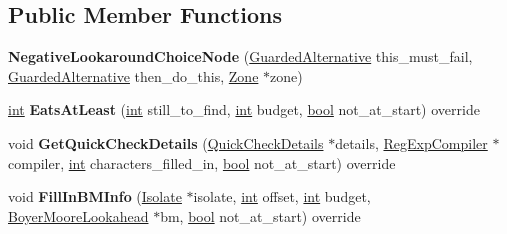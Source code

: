 \subsection*{Public Member Functions}
\begin{DoxyCompactItemize}
\item 
\mbox{\label{classv8_1_1internal_1_1NegativeLookaroundChoiceNode_af0c3c86f8e0cd7a812625f1abea993a0}} 
{\bfseries Negative\+Lookaround\+Choice\+Node} (\mbox{\hyperlink{classv8_1_1internal_1_1GuardedAlternative}{Guarded\+Alternative}} this\+\_\+must\+\_\+fail, \mbox{\hyperlink{classv8_1_1internal_1_1GuardedAlternative}{Guarded\+Alternative}} then\+\_\+do\+\_\+this, \mbox{\hyperlink{classv8_1_1internal_1_1Zone}{Zone}} $\ast$zone)
\item 
\mbox{\label{classv8_1_1internal_1_1NegativeLookaroundChoiceNode_a18c2fb951ec0a7755588f9a672ec5f56}} 
\mbox{\hyperlink{classint}{int}} {\bfseries Eats\+At\+Least} (\mbox{\hyperlink{classint}{int}} still\+\_\+to\+\_\+find, \mbox{\hyperlink{classint}{int}} budget, \mbox{\hyperlink{classbool}{bool}} not\+\_\+at\+\_\+start) override
\item 
\mbox{\label{classv8_1_1internal_1_1NegativeLookaroundChoiceNode_ada390b6fda9574973a221eee6379afa9}} 
void {\bfseries Get\+Quick\+Check\+Details} (\mbox{\hyperlink{classv8_1_1internal_1_1QuickCheckDetails}{Quick\+Check\+Details}} $\ast$details, \mbox{\hyperlink{classv8_1_1internal_1_1RegExpCompiler}{Reg\+Exp\+Compiler}} $\ast$compiler, \mbox{\hyperlink{classint}{int}} characters\+\_\+filled\+\_\+in, \mbox{\hyperlink{classbool}{bool}} not\+\_\+at\+\_\+start) override
\item 
\mbox{\label{classv8_1_1internal_1_1NegativeLookaroundChoiceNode_ac33b430fc3eb64ac681116f3f33b6121}} 
void {\bfseries Fill\+In\+B\+M\+Info} (\mbox{\hyperlink{classv8_1_1internal_1_1Isolate}{Isolate}} $\ast$isolate, \mbox{\hyperlink{classint}{int}} offset, \mbox{\hyperlink{classint}{int}} budget, \mbox{\hyperlink{classv8_1_1internal_1_1BoyerMooreLookahead}{Boyer\+Moore\+Lookahead}} $\ast$bm, \mbox{\hyperlink{classbool}{bool}} not\+\_\+at\+\_\+start) override
\item 
\mbox{\label{classv8_1_1internal_1_1NegativeLookaroundChoiceNode_a8510ca58dc92b3a81fdea20d87cea24a}} 

\end{DoxyCompactItemize}
